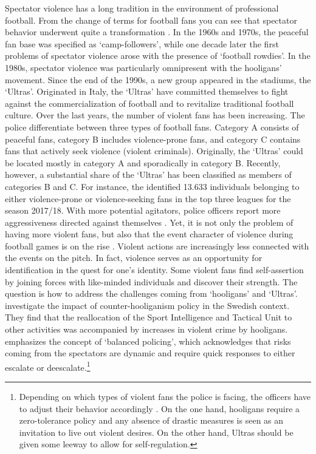 Spectator violence has a long tradition in the environment of professional football. From the change of terms for football fans you can see that spectator behavior underwent quite a transformation \citep{pilz2005kuttenfan}. In the 1960s and 1970s, the peaceful fan base was specified as `camp-followers', while one decade later the first problems of spectator violence arose with the presence of `football rowdies'. In the 1980s, spectator violence was particularly omnipresent with the hooligans' movement. Since the end of the 1990s, a new group appeared in the stadiums, the `Ultras'. Originated in Italy, the `Ultras' have committed themselves to fight against the commercialization of football and to revitalize traditional football culture. Over the last years, the number of violent fans has been increasing. The police differentiate between three types of football fans. Category A consists of peaceful fans, category B includes violence-prone fans, and category C contains fans that actively seek violence (violent criminals). Originally, the `Ultras' could be located mostly in category A and sporadically in category B. Recently, however, a substantial share of the `Ultras' has been classified as members of categories B and C. For instance, the \cite{zis17_18} identified 13.633 individuals belonging to either violence-prone or violence-seeking fans in the top three leagues for the season 2017/18. With more potential agitators, police officers report more aggressiveness directed against themselves \citep{feltes2010fussballgewalt}. Yet, it is not only the problem of having more violent fans, but also that the event character of violence during football games is on the rise \citep{pilz2005kuttenfan}. Violent actions are increasingly less connected with the events on the pitch. In fact, violence serves as an opportunity for identification in the quest for one's identity. Some violent fans find self-assertion by joining forces with like-minded individuals and discover their strength. The question is how to address the challenges coming from `hooligans' and `Ultras'. \cite{poutvaara2009police} investigate the impact of counter-hooliganism policy in the Swedish context. They find that the reallocation of the Sport Intelligence and Tactical Unit to other activities was accompanied by increases in violent crime by hooligans. \cite{feltes2010fussballgewalt} emphasizes the concept of `balanced policing', which acknowledges that risks coming from the spectators are dynamic and require quick responses to either escalate or deescalate.\footnote{Depending on which types of violent fans the police is facing, the officers have to adjust their behavior accordingly \citep{feltes2010fussballgewalt}. On the one hand, hooligans require a zero-tolerance policy and any absence of drastic measures is seen as an invitation to live out violent desires. On the other hand, Ultras should be given some leeway to allow for self-regulation.} 



